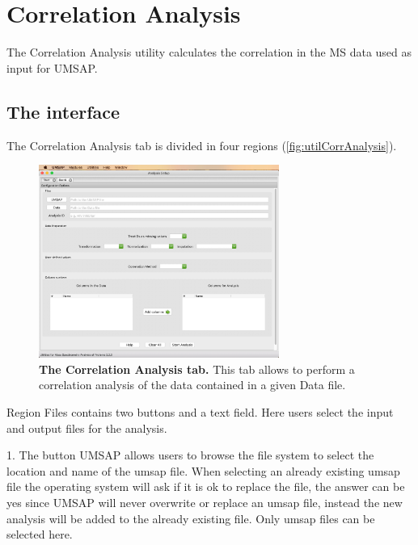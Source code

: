 \chapter{Correlation Analysis}
\label{chap:corrA}

The Correlation Analysis utility calculates the correlation in the MS data used
as input for UMSAP.

\section{The interface}

The Correlation Analysis tab is divided in four regions (\autoref{fig:utilCorrAnalysis}).

\begin{figure}[h]
    \centering
    \includegraphics[width=0.7\textwidth]{./IMAGES/UTIL-CORR-WINDOW/util-corr.jpg}
    \caption[The Correlation Analysis tab]{\textbf{The Correlation Analysis tab.}
    This tab allows to perform a correlation analysis of the data contained in a
    given Data file.} 
    \label{fig:utilCorrAnalysis}
    \vspace{-5pt}
\end{figure}

Region Files contains two buttons and a text field. Here users select the input
and output files for the analysis.

\num{1}. The button UMSAP allows users to browse the file system to select the location
and name of the umsap file. When selecting an already existing umsap file the operating
system will ask if it is ok to replace the file, the answer can be yes since UMSAP
will never overwrite or replace an umsap file, instead the new analysis will be
added to the already existing file. Only umsap files can be selected here.

